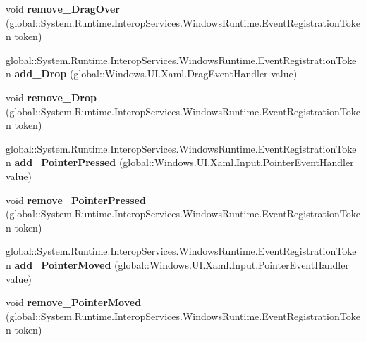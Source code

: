 \begin{DoxyCompactItemize}
void {\bfseries remove\+\_\+\+Drag\+Over} (global\+::\+System.\+Runtime.\+Interop\+Services.\+Windows\+Runtime.\+Event\+Registration\+Token token)
\item 
\mbox{\label{interface_windows_1_1_u_i_1_1_xaml_1_1_i_u_i_element_a1aa925e3d35192dcae38b8299243b5f4}} 
global\+::\+System.\+Runtime.\+Interop\+Services.\+Windows\+Runtime.\+Event\+Registration\+Token {\bfseries add\+\_\+\+Drop} (global\+::\+Windows.\+U\+I.\+Xaml.\+Drag\+Event\+Handler value)
\item 
\mbox{\label{interface_windows_1_1_u_i_1_1_xaml_1_1_i_u_i_element_a8138853a5ec389ca042bd806a4488df2}} 
void {\bfseries remove\+\_\+\+Drop} (global\+::\+System.\+Runtime.\+Interop\+Services.\+Windows\+Runtime.\+Event\+Registration\+Token token)
\item 
\mbox{\label{interface_windows_1_1_u_i_1_1_xaml_1_1_i_u_i_element_ac6c56c4e4d441548d94d567610440f7a}} 
global\+::\+System.\+Runtime.\+Interop\+Services.\+Windows\+Runtime.\+Event\+Registration\+Token {\bfseries add\+\_\+\+Pointer\+Pressed} (global\+::\+Windows.\+U\+I.\+Xaml.\+Input.\+Pointer\+Event\+Handler value)
\item 
\mbox{\label{interface_windows_1_1_u_i_1_1_xaml_1_1_i_u_i_element_a11ea5ff510170be96baba63e50ef0d68}} 
void {\bfseries remove\+\_\+\+Pointer\+Pressed} (global\+::\+System.\+Runtime.\+Interop\+Services.\+Windows\+Runtime.\+Event\+Registration\+Token token)
\item 
\mbox{\label{interface_windows_1_1_u_i_1_1_xaml_1_1_i_u_i_element_a186c081f1e37b9989fc4ddd5820d840c}} 
global\+::\+System.\+Runtime.\+Interop\+Services.\+Windows\+Runtime.\+Event\+Registration\+Token {\bfseries add\+\_\+\+Pointer\+Moved} (global\+::\+Windows.\+U\+I.\+Xaml.\+Input.\+Pointer\+Event\+Handler value)
\item 
\mbox{\label{interface_windows_1_1_u_i_1_1_xaml_1_1_i_u_i_element_ad8d5295f79014845522686f6bf012501}} 
void {\bfseries remove\+\_\+\+Pointer\+Moved} (global\+::\+System.\+Runtime.\+Interop\+Services.\+Windows\+Runtime.\+Event\+Registration\+Token token)

\end{DoxyCompactItemize}
